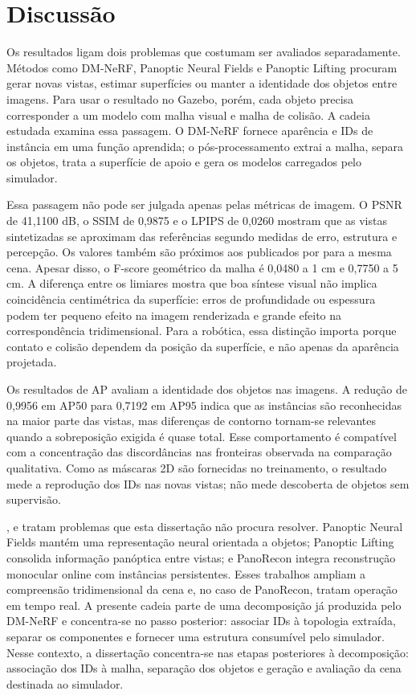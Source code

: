\chapter{Discussão}\label{cap:discussao}

Os resultados ligam dois problemas que costumam ser avaliados separadamente. Métodos como DM-NeRF, Panoptic Neural Fields e Panoptic Lifting procuram gerar novas vistas, estimar superfícies ou manter a identidade dos objetos entre imagens. Para usar o resultado no Gazebo, porém, cada objeto precisa corresponder a um modelo com malha visual e malha de colisão. A cadeia estudada examina essa passagem. O DM-NeRF fornece aparência e IDs de instância em uma função aprendida; o pós-processamento extrai a malha, separa os objetos, trata a superfície de apoio e gera os modelos carregados pelo simulador.

Essa passagem não pode ser julgada apenas pelas métricas de imagem. O PSNR de 41,1100 dB, o SSIM de 0,9875 e o LPIPS de 0,0260 mostram que as vistas sintetizadas se aproximam das referências segundo medidas de erro, estrutura e percepção. Os valores também são próximos aos publicados por \citet{wang2023dmnerf} para a mesma cena. Apesar disso, o F-score geométrico da malha é 0,0480 a 1 cm e 0,7750 a 5 cm. A diferença entre os limiares mostra que boa síntese visual não implica coincidência centimétrica da superfície: erros de profundidade ou espessura podem ter pequeno efeito na imagem renderizada e grande efeito na correspondência tridimensional. Para a robótica, essa distinção importa porque contato e colisão dependem da posição da superfície, e não apenas da aparência projetada.

Os resultados de AP avaliam a identidade dos objetos nas imagens. A redução de 0,9956 em AP50 para 0,7192 em AP95 indica que as instâncias são reconhecidas na maior parte das vistas, mas diferenças de contorno tornam-se relevantes quando a sobreposição exigida é quase total. Esse comportamento é compatível com a concentração das discordâncias nas fronteiras observada na comparação qualitativa. Como as máscaras 2D são fornecidas no treinamento, o resultado mede a reprodução dos IDs nas novas vistas; não mede descoberta de objetos sem supervisão.

\citet{kundu2022panoptic}, \citet{siddiqui2023panoptic} e \citet{wu2024panorecon} tratam problemas que esta dissertação não procura resolver. Panoptic Neural Fields mantém uma representação neural orientada a objetos; Panoptic Lifting consolida informação panóptica entre vistas; e PanoRecon integra reconstrução monocular online com instâncias persistentes. Esses trabalhos ampliam a compreensão tridimensional da cena e, no caso de PanoRecon, tratam operação em tempo real. A presente cadeia parte de uma decomposição já produzida pelo DM-NeRF e concentra-se no passo posterior: associar IDs à topologia extraída, separar os componentes e fornecer uma estrutura consumível pelo simulador. Nesse contexto, a dissertação concentra-se nas etapas posteriores à decomposição: associação dos IDs à malha, separação dos objetos e geração e avaliação da cena destinada ao simulador.

